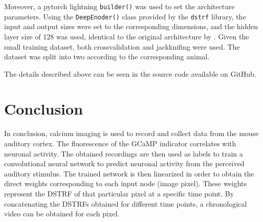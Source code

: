 Moreover, a pytorch lightning \verb|builder()| was used to set the architecture parameters. Using the \verb|DeepEnoder()| class provided by the \verb|dstrf| library, the input and output sizes were set to the corresponding dimensions, and the hidden layer size of 128 was used, identical to the original architecture by \cite{keshishianEstimatingInterpretingNonlinear2020}. Given the small training dataset, both crossvalidation and jackknifing were used. The dataset was split into two according to the corresponding animal.

The details described above can be seen in the source code available on GitHub.

\section{Conclusion}
In conclusion, calcium imaging is used to record and collect data from the mouse auditory cortex. The fluorescence of the GCaMP indicator correlates with neuronal activity. The obtained recordings are then used as labels to train a convolutional neural network to predict neuronal activity from the perceived auditory stimulus. The trained network is then linearized in order to obtain the direct weights corresponding to each input node (image pixel). These weights represent the DSTRF of that particular pixel at a specific time point. By concatenating the DSTRFs obtained for different time points, a chronological video can be obtained for each pixel.